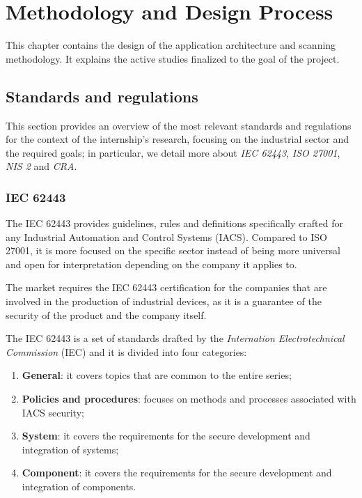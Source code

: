\chapter{Methodology and Design Process}

This chapter contains the design of the application architecture and scanning methodology. It explains the active studies finalized to the goal of the project.



\section{Standards and regulations}

This section provides an overview of the most relevant standards and regulations for the context of the internship's research, focusing on the industrial sector and the required goals; in particular, we detail more about \textit{IEC 62443}, \textit{ISO 27001}, \textit{NIS 2} and \textit{CRA}.

\subsection{IEC 62443}
\label{sec:iec-62443}

The IEC 62443 provides guidelines, rules and definitions specifically crafted for any Industrial Automation and Control Systems (IACS). Compared to ISO 27001, it is more focused on the specific sector instead of being more universal and open for interpretation depending on the company it applies to.

The market requires the IEC 62443 certification for the companies that are involved in the production of industrial devices, as it is a guarantee of the security of the product and the company itself.

The IEC 62443 is a set of standards drafted by the \textit{Internation Electrotechnical Commission} (IEC) and it is divided into four categories:~\cite{understanding-iec-62443-parts}
\begin{enumerate}
  \item \textbf{General}: it covers topics that are common to the entire series;
  \item \textbf{Policies and procedures}: focuses on methods and processes associated with IACS security;
  \item \textbf{System}: it covers the requirements for the secure development and integration of systems;
  \item \textbf{Component}: it covers the requirements for the secure development and integration of components.
\end{enumerate}

